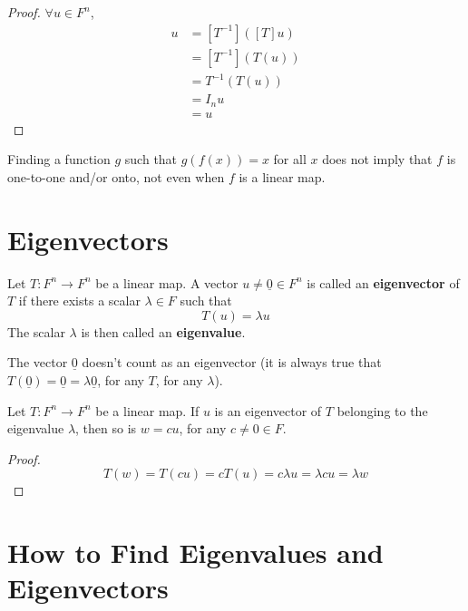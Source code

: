 \begin{proof} $\forall u \in F^n$, \begin{align*} [T^{-1}][T]u &=
[T^{-1}]([T]u) \\ &= [T^{-1}](T(u)) \\ &= T^{-1}(T(u)) \\ &= I_n u \\ &= u
\end{align*} \end{proof}

\begin{note} Finding a function $g$ such that $g(f(x)) = x$ for all $x$ does
not imply that $f$ is one-to-one and/or onto, not even when $f$ is a linear map.
\end{note}

 \section{Eigenvectors}

\begin{definition}\label{def:eigenvector} Let $T:
F^n \to F^n$ be a linear map. A vector $u \neq \underline{0} \in F^n$ is called
an \textbf{eigenvector} of $T$ if there exists a scalar $\lambda \in F$ such
that \[ T(u) = \lambda u \] The scalar $\lambda$ is then called an
\textbf{eigenvalue}. \end{definition}

\begin{note} The vector $\underline{0}$ doesn't count as an eigenvector (it is
always true that $T(\underline{0}) = \underline{0} = \lambda \underline{0}$, for
any $T$, for any $\lambda$). \end{note}

\begin{theorem}\label{thm:eigenvector-scalar-multiple} Let $T: F^n \to F^n$ be
a linear map. If $u$ is an eigenvector of $T$ belonging to the eigenvalue
$\lambda$, then so is $w = cu$, for any $c \neq 0 \in F$. \end{theorem}

\begin{proof} \[ T(w) = T(cu) = cT(u) = c\lambda u = \lambda cu = \lambda w \]
\end{proof}

 \section{How to Find
Eigenvalues and Eigenvectors}

